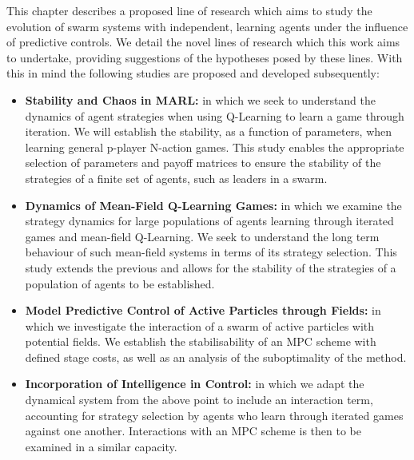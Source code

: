 \documentclass[.../main.tex]{subfiles}
\begin{document}
	This chapter describes a proposed line of research which aims
        to study the evolution of swarm systems with independent,
        learning agents under the influence of predictive controls. We
        detail the novel lines of research which this work aims to
        undertake, providing suggestions of the hypotheses posed by
        these lines. With this in mind the following studies are
        proposed and developed subsequently:

	\begin{itemize}
		\item \textbf{Stability and Chaos in MARL:} in which
                  we seek to understand the dynamics of agent
                  strategies when using Q-Learning to learn a game
                  through iteration. We will establish the stability,
                  as a function of parameters, when learning general
                  p-player N-action games.  This study enables the
                  appropriate selection of parameters and payoff
                  matrices to ensure the stability of the strategies
                  of a finite set of agents, such as leaders in a
                  swarm.


              \item \textbf{Dynamics of Mean-Field Q-Learning Games:} in which we examine the
		strategy dynamics for large populations of agents learning through iterated games and
		mean-field Q-Learning. We seek to understand the long term behaviour of such mean-field
		systems in terms of its strategy selection. This study extends the previous and allows for
		the stability of the strategies of a population of agents to be established.
		\item \textbf{Model Predictive Control of Active Particles through Fields:} in which we
		investigate the interaction of a swarm of active particles with potential fields. We
		establish the stabilisability of an MPC scheme with defined stage costs, as well as an
		analysis of the suboptimality of the method.
		\item \textbf{Incorporation of Intelligence in Control:} in which we adapt the dynamical
		system from the above point to include an interaction term, accounting for strategy
		selection by agents who learn through iterated games against one another. Interactions with
		an MPC scheme is then to be examined in a similar capacity.

	\end{itemize}
\end{document}
